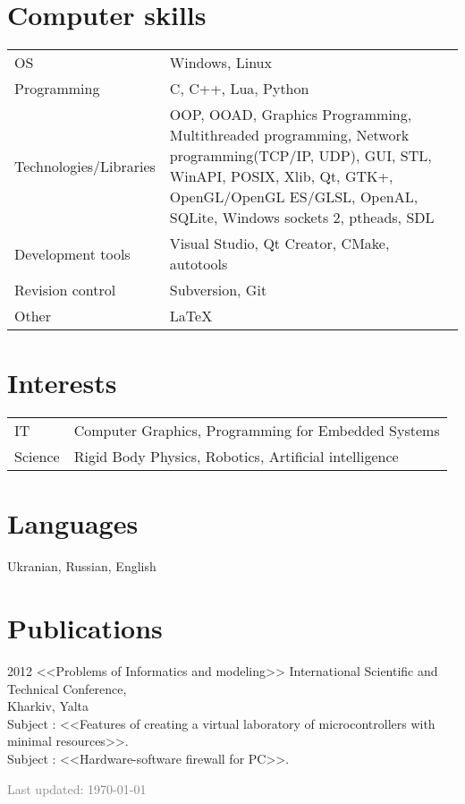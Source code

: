 \documentclass[11pt,a4paper]{article}
\begin{document}
\section*{Computer skills}
\begin{tabular}{p{4cm} p{12cm}}
OS & Windows, Linux\\
Programming & C, C++, Lua, Python\\
Technologies/Libraries & OOP, OOAD, Graphics Programming, Multithreaded programming, Network programming(TCP/IP, UDP), GUI, STL, WinAPI, POSIX, Xlib, Qt, GTK+, OpenGL/OpenGL ES/GLSL, OpenAL, SQLite, Windows sockets 2, ptheads, SDL\\
Development tools & Visual Studio, Qt Creator, CMake, autotools\\
Revision control & Subversion, Git\\
Other & LaTeX\\
\end{tabular}

\section*{Interests}
\begin{tabular}{p{4cm} p{12cm}}
IT & Computer Graphics, Programming for Embedded Systems\\
Science & Rigid Body Physics, Robotics, Artificial intelligence\\
\end{tabular}

\section*{Languages}
Ukranian, Russian, English
\section*{Publications}
2012 <<Problems of Informatics and modeling>> International Scientific and Technical Conference,\\ Kharkiv, Yalta\\
Subject : <<Features of creating a virtual laboratory of microcontrollers with minimal resources>>.\\
Subject : <<Hardware-software firewall for PC>>.
\vfill

\begin{center}
\textcolor{gray}{Last updated: \today}
\end{center}
\end{document}
